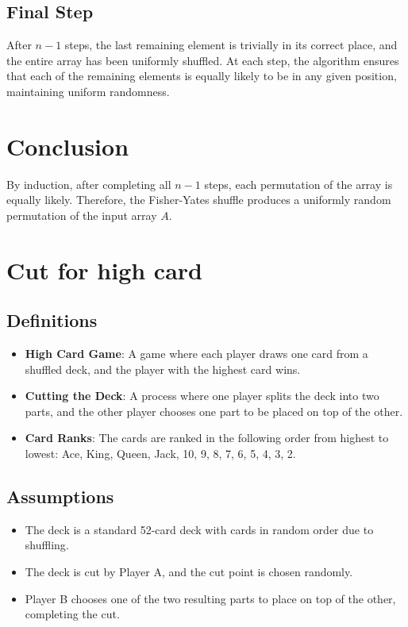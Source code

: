 \documentclass{article}
\begin{document}
\subsection*{Final Step}
After \( n-1 \) steps, the last remaining element is trivially in its correct place, and the entire array has been uniformly shuffled. At each step, the algorithm ensures that each of the remaining elements is equally likely to be in any given position, maintaining uniform randomness.

\section*{Conclusion}
By induction, after completing all \( n-1 \) steps, each permutation of the array is equally likely. Therefore, the Fisher-Yates shuffle produces a uniformly random permutation of the input array \( A \).

\section{Cut for high card}

\subsection*{Definitions}

\begin{itemize}
    \item \textbf{High Card Game}: A game where each player draws one card from a shuffled deck, and the player with the highest card wins.
    \item \textbf{Cutting the Deck}: A process where one player splits the deck into two parts, and the other player chooses one part to be placed on top of the other.
    \item \textbf{Card Ranks}: The cards are ranked in the following order from highest to lowest: Ace, King, Queen, Jack, 10, 9, 8, 7, 6, 5, 4, 3, 2.

\end{itemize}

\subsection*{Assumptions}

\begin{itemize}
    \item The deck is a standard 52-card deck with cards in random order due to shuffling.
    \item The deck is cut by Player A, and the cut point is chosen randomly.
    \item Player B chooses one of the two resulting parts to place on top of the other, completing the cut.
\end{itemize}
\end{document}
